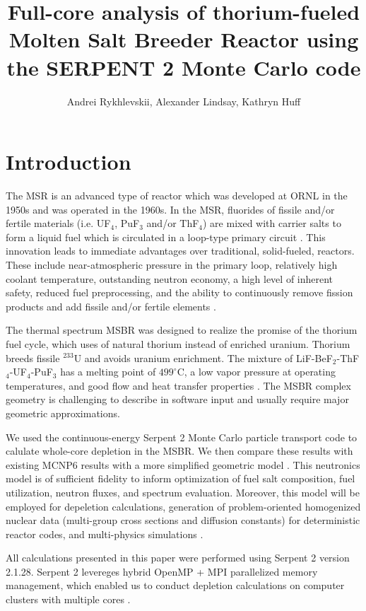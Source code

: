 \documentclass{anstrans}
\title{Full-core analysis of thorium-fueled Molten Salt Breeder Reactor using the SERPENT 2 Monte Carlo code}
\author{Andrei Rykhlevskii, Alexander Lindsay, Kathryn Huff}
\institute{
Department of Nuclear, Plasma, and Radiological Engineering, University of Illinois at Urbana-Champaign \break
Urbana, IL
}
\begin{document}
\section{Introduction}
The \gls{MSR} is an advanced type of reactor which was developed at \gls{ORNL} in the 1950s and was operated in the 1960s. In the MSR, fluorides of fissile and/or fertile materials (i.e. UF$_4$, PuF$_3$ and/or ThF$_4$) are mixed with carrier salts to form a liquid fuel which is circulated in a loop-type primary circuit \cite{haubenreich_experience_1970}. This innovation leads to immediate advantages over traditional, solid-fueled, reactors. These include near-atmospheric pressure in the primary loop, relatively high coolant temperature, outstanding neutron economy, a high level of inherent safety, reduced fuel preprocessing, and the ability to continuously remove fission products and add fissile and/or fertile elements \cite{leblanc_molten_2010}. 

The thermal spectrum \gls{MSBR} was designed to realize the promise of the 
thorium fuel cycle, which uses of natural thorium instead of enriched uranium. 
Thorium breeds fissile $^{233}$U and avoids uranium enrichment. The mixture of 
LiF-BeF$_2$-ThF$_4$-UF$_4$-PuF$_3$ has a melting point of $499^\circ$C, a low 
vapor pressure at operating temperatures, and good flow and heat transfer 
properties \cite{robertson_conceptual_1971}. The \gls{MSBR} complex geometry is 
challenging to describe in software input and usually require major 
geometric approximations\cite{park_whole_2015}. 

We used the continuous-energy Serpent 2 Monte Carlo particle transport code to 
calulate whole-core depletion in the \gls{MSBR}. We then compare these results 
with existing MCNP6 results with a more simplified geometric model 
\cite{park_whole_2015,leppanen_serpent_2012}. This neutronics model is of 
sufficient fidelity to inform optimization of fuel salt composition, fuel 
utilization, neutron fluxes, and spectrum evaluation. Moreover, this model  
will be employed for depeletion calculations, generation of problem-oriented 
homogenized nuclear data (multi-group cross sections and diffusion constants) 
for deterministic reactor codes, and multi-physics simulations \cite{fridman_use_2011,valtavirta_coupled_2017}.

All calculations presented in this paper were performed using Serpent 2 version 
2.1.28. Serpent 2 levereges hybrid OpenMP + MPI parallelized memory management, 
which enabled us to conduct depletion calculations on computer clusters with multiple cores \cite{leppanen_serpent_2015}. 
\end{document}
